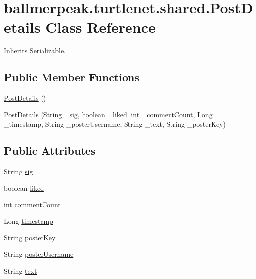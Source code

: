 \hypertarget{classballmerpeak_1_1turtlenet_1_1shared_1_1PostDetails}{\section{ballmerpeak.\-turtlenet.\-shared.\-Post\-Details Class Reference}
\label{classballmerpeak_1_1turtlenet_1_1shared_1_1PostDetails}
}


Inherits Serializable.

\subsection*{Public Member Functions}
\begin{DoxyCompactItemize}
\item 
\hyperlink{classballmerpeak_1_1turtlenet_1_1shared_1_1PostDetails_ac805c8c68de597a5ff5696d1d253b5a7}{Post\-Details} ()
\item 
\hyperlink{classballmerpeak_1_1turtlenet_1_1shared_1_1PostDetails_a1f3b272444d0abfc4e4fc374c2a0c833}{Post\-Details} (String \-\_\-sig, boolean \-\_\-liked, int \-\_\-comment\-Count, Long \-\_\-timestamp, String \-\_\-poster\-Username, String \-\_\-text, String \-\_\-poster\-Key)
\end{DoxyCompactItemize}
\subsection*{Public Attributes}
\begin{DoxyCompactItemize}
\item 
String \hyperlink{classballmerpeak_1_1turtlenet_1_1shared_1_1PostDetails_ac6f606b33cca7c5be0e3eb908241bf8e}{sig}
\item 
boolean \hyperlink{classballmerpeak_1_1turtlenet_1_1shared_1_1PostDetails_aea0cbf8b30b582800479e28eeb1e931f}{liked}
\item 
int \hyperlink{classballmerpeak_1_1turtlenet_1_1shared_1_1PostDetails_a24553cdb518e4501cbdf63263c21d1a0}{comment\-Count}
\item 
Long \hyperlink{classballmerpeak_1_1turtlenet_1_1shared_1_1PostDetails_a0602043b91650f4eec3d4b71175b7362}{timestamp}
\item 
String \hyperlink{classballmerpeak_1_1turtlenet_1_1shared_1_1PostDetails_a01a466200c299cca8b1cefabb10973d7}{poster\-Key}
\item 
String \hyperlink{classballmerpeak_1_1turtlenet_1_1shared_1_1PostDetails_a15dfe34395623678a63f569dc9339cbd}{poster\-Username}
\item 
String \hyperlink{classballmerpeak_1_1turtlenet_1_1shared_1_1PostDetails_a28dbe8ca59c66a80b1d0538f5485314d}{text}
\end{DoxyCompactItemize}


